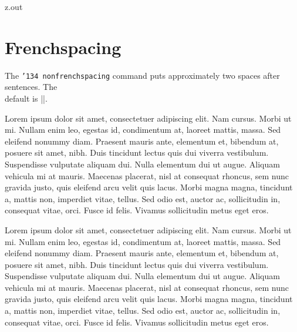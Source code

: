 \begin{VerbatimOut}{z.out}
  

\section{Frenchspacing}%
\index{\verb+\frenchspacing+}
\index{\verb+\nonfrenchspacing+}

The
\def\t{{\tt\char'134 frenchspacing}}
\def\u{{\tt\char'134 nonfrenchspacing}}
\hbox{\rlap{\t}}%
\hbox{\u}
command puts approximately
\hbox{}%
\hbox{two}
spaces after sentences.
The\\[3pt]
default is |\nonfrenchspacing|.

{\frenchspacing
Lorem ipsum dolor sit amet, consectetuer adipiscing elit. Nam
cursus. Morbi ut mi. Nullam enim leo, egestas id, condimentum at,
laoreet mattis, massa. Sed eleifend nonummy diam. Praesent mauris
ante, elementum et, bibendum at, posuere sit amet, nibh. Duis
tincidunt lectus quis dui viverra vestibulum. Suspendisse
vulputate aliquam dui. Nulla elementum dui ut augue. Aliquam
vehicula mi at mauris. Maecenas placerat, nisl at consequat
rhoncus, sem nunc gravida justo, quis eleifend arcu velit quis
lacus. Morbi magna magna, tincidunt a, mattis non, imperdiet
vitae, tellus. Sed odio est, auctor ac, sollicitudin in,
consequat vitae, orci. Fusce id felis. Vivamus sollicitudin metus
eget eros.\endgraf
}

Lorem ipsum dolor sit amet, consectetuer adipiscing elit. Nam
cursus. Morbi ut mi. Nullam enim leo, egestas id, condimentum at,
laoreet mattis, massa. Sed eleifend nonummy diam. Praesent mauris
ante, elementum et, bibendum at, posuere sit amet, nibh. Duis
tincidunt lectus quis dui viverra vestibulum. Suspendisse
vulputate aliquam dui. Nulla elementum dui ut augue. Aliquam
vehicula mi at mauris. Maecenas placerat, nisl at consequat
rhoncus, sem nunc gravida justo, quis eleifend arcu velit quis
lacus. Morbi magna magna, tincidunt a, mattis non, imperdiet
vitae, tellus. Sed odio est, auctor ac, sollicitudin in,
consequat vitae, orci. Fusce id felis. Vivamus sollicitudin metus
eget eros.
\end{VerbatimOut}

\MyIO


